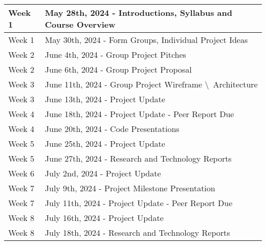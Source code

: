 \renewcommand{\arraystretch}{1.5}



\begin{tabular}{ | l | l |  }
    \hline
    Week 1 & May 28th, 2024 - Introductions, Syllabus and Course Overview \\
    \hline
    Week 1 & May 30th, 2024 - Form Groups, Individual Project Ideas \\
    \hline
    Week 2 & June 4th, 2024 - Group Project Pitches \\ 
    \hline
    Week 2 & June 6th, 2024 - Group Project Proposal \\ 
    \hline
    Week 3 & June 11th, 2024 - Group Project Wireframe \textbackslash \ Architecture\\ 
    \hline
    Week 3 & June 13th, 2024 - Project Update  \\ 
    \hline
    Week 4 & June 18th, 2024 - Project Update - Peer Report Due\\ 
    \hline
    Week 4 & June 20th, 2024 - Code Presentations \\ 
    \hline
    Week 5 & June 25th, 2024 - Project Update \\ 
    \hline
    Week 5 & June 27th, 2024 - Research and Technology Reports \\ 
    \hline
    Week 6 & July 2nd, 2024 - Project Update \\ 
    \hline
    Week 7 & July 9th, 2024 -  Project Milestone Presentation \\ 
    \hline
    Week 7 & July 11th, 2024 - Project Update - Peer Report Due \\ 
    \hline
    Week 8 & July 16th, 2024 - Project Update \\ 
    \hline
    Week 8 & July 18th, 2024 - Research and Technology Reports \\ 

\end{tabular}
